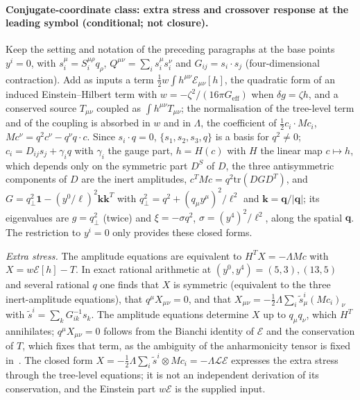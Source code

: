 \paragraph{Conjugate-coordinate class: extra stress and crossover response at the leading symbol (conditional; not closure).}

Keep the setting and notation of the preceding paragraphs at the base points \(y^i=0\), with \(s_i^\mu=S_i^{\mu\rho}q_\rho\), \(Q^{\mu\nu}=\sum_is_i^\mu s_i^\nu\) and \(G_{ij}=s_i\!\cdot\! s_j\) (four-dimensional contraction). Add as inputs a term \(\tfrac12w\int h^{\mu\nu}\mathcal E_{\mu\nu}[h]\), the quadratic form of an induced Einstein--Hilbert term with \(w=-\zeta^2/(16\pi G_{\mathrm{eff}})\) when \(\delta g=\zeta h\), and a conserved source \(T_{\mu\nu}\) coupled as \(\int h^{\mu\nu}T_{\mu\nu}\); the normalisation of the tree-level term and of the coupling is absorbed in \(w\) and in \(\Lambda\), the coefficient of \(\tfrac12c_i\cdot Mc_i\), \(Mc^\nu=q^2c^\nu-q^\nu q\!\cdot\! c\). Since \(s_i\!\cdot\! q=0\), \(\{s_1,s_2,s_3,q\}\) is a basis for \(q^2\neq0\); \(c_i=D_{ij}s_j+\gamma_iq\) with \(\gamma_i\) the gauge part, \(h=H(c)\) with \(H\) the linear map \(c\mapsto h\), which depends only on the symmetric part \(D^{S}\) of \(D\), the three antisymmetric components of \(D\) are the inert amplitudes, \(c^TMc=q^2\mathrm{tr}(DGD^T)\), and \(G=q_\perp^2\mathbf 1-(y^0/\ell)^2\mathbf k\mathbf k^T\) with \(q_\perp^2=q^2+(q_\mu y^\mu)^2/\ell^2\) and \(\mathbf k=\mathbf q/|\mathbf q|\); its eigenvalues are \(g=q_\perp^2\) (twice) and \(\xi=-\sigma q^2\), \(\sigma=(y^4)^2/\ell^2\), along the spatial \(\mathbf q\). The restriction to \(y^i=0\) only provides these closed forms.



\emph{Extra stress.} The amplitude equations are equivalent to \(H^{T}X=-\Lambda Mc\) with \(X=w\mathcal E[h]-T\). In exact rational arithmetic at \((y^0,y^4)=(5,3),(13,5)\) and several rational \(q\) one finds that \(X\) is symmetric (equivalent to the three inert-amplitude equations), that \(q^\mu X_{\mu\nu}=0\), and that \(X_{\mu\nu}=-\tfrac12\Lambda\sum_i\tilde s^i_\mu(Mc_i)_\nu\) with \(\tilde s^i=\sum_kG^{-1}_{ik}s_k\). The amplitude equations determine \(X\) up to \(q_\mu q_\nu\), which \(H^T\) annihilates; \(q^\mu X_{\mu\nu}=0\) follows from the Bianchi identity of \(\mathcal E\) and the conservation of \(T\), which fixes that term, as the ambiguity of the anharmonicity tensor is fixed in~\cite{KumarSteinacker2023,Steinacker2026}. The closed form \(X=-\tfrac12\Lambda\sum_i\tilde s^i\otimes Mc_i=-\Lambda\mathcal L\mathcal E\) expresses the extra stress through the tree-level equations; it is not an independent derivation of its conservation, and the Einstein part \(w\mathcal E\) is the supplied input.



